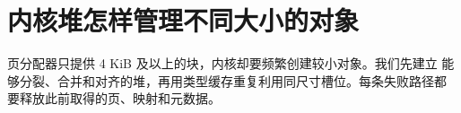\chapter{内核堆怎样管理不同大小的对象}

页分配器只提供 4 KiB 及以上的块，内核却要频繁创建较小对象。我们先建立
能够分裂、合并和对齐的堆，再用类型缓存重复利用同尺寸槽位。每条失败路径都
要释放此前取得的页、映射和元数据。



